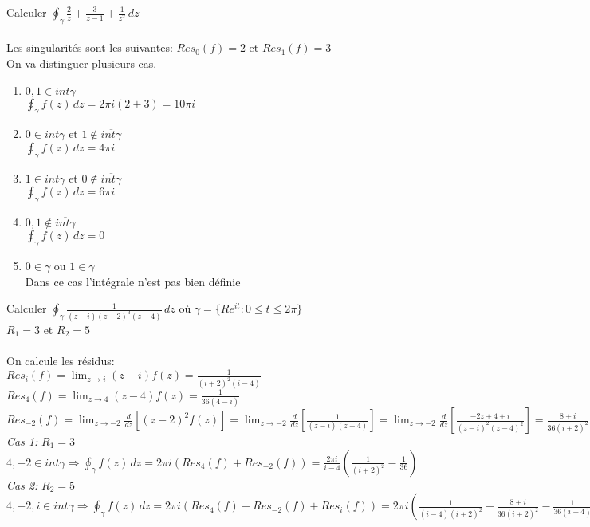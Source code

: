 \begin{myExample}
	Calculer $\oint_\gamma \frac{2}{z}+\frac{3}{z-1}+\frac{1}{z^2}\,dz$
	\\\\
	Les singularités sont les suivantes: $Res_{0}(f)=2$ et $Res_{1}(f)=3$
	\\
	On va distinguer plusieurs cas.
	\begin{enumerate}
		\item $0, 1 \in int \gamma$
		\\
		$\oint_\gamma f(z)\,dz=2\pi i(2+3)=10\pi i$
		\item $0\in int \gamma$ et $1\notin \overline{int \gamma}$
		\\
		$\oint_\gamma f(z)\,dz=4\pi i$
		\item $1\in int \gamma$ et $0\notin \overline{int \gamma}$
		\\
		$\oint_\gamma f(z)\,dz=6\pi i$
		\item $0, 1\notin \overline{int \gamma}$
		\\
		$\oint_\gamma f(z)\,dz=0$
		\item $0\in \gamma$ ou $1\in \gamma$
		\\
		Dans ce cas l'intégrale n'est pas bien définie
	\end{enumerate}
\end{myExample}

\begin{myExample}
	Calculer $\oint_\gamma \frac{1}{(z-i)(z+2)^3(z-4)}\,dz$ où 	$\gamma = \{Re^{it}: 0\leq t\leq 2\pi\}$
	\\$R_{1}=3$ et $R_{2}=5$
	\\\\
	On calcule les résidus:\\
	$Res_{i}(f)=\lim_{z\rightarrow i}(z-i)f(z)=\frac{1}{(i+2)^2(i-4)}$
	\\
	$Res_{4}(f)=\lim_{z\rightarrow 4}(z-4)f(z)=\frac{1}{36(4-i)}$
	\\
	$Res_{-2}(f)=\lim_{z\rightarrow -2}\frac{d}{dz}[(z-2)^2f(z)]=\lim_{z\rightarrow -2}\frac{d}{dz}[\frac{1}{(z-i)(z-4)}]=\lim_{z\rightarrow -2}\frac{d}{dz}[\frac{-2z+4+i}{(z-i)^2(z-4)^2}]=\frac{8+i}{36(i+2)^2}$	
	\\
	{\it Cas 1: }$R_{1}=3$
	\\
		$4, -2 \in int \gamma \Rightarrow \oint_\gamma f(z)\,dz=2\pi i(Res_4(f)+Res_{-2}(f))=\frac{2\pi i}{i-4}(\frac{1}{(i+2)^2}-\frac{1}{36})$
	\\
	{\it Cas 2: }$R_{2}=5$
	\\
		$4, -2, i \in int \gamma \Rightarrow \oint_\gamma f(z)\,dz=2\pi i(Res_4(f)+Res_{-2}(f)+Res_i(f))=2\pi i(\frac{1}{(i-4)(i+2)^2}+\frac{8+i}{36(i+2)^2}-\frac{1}{36(i-4)})=0$
	
\end{myExample}

